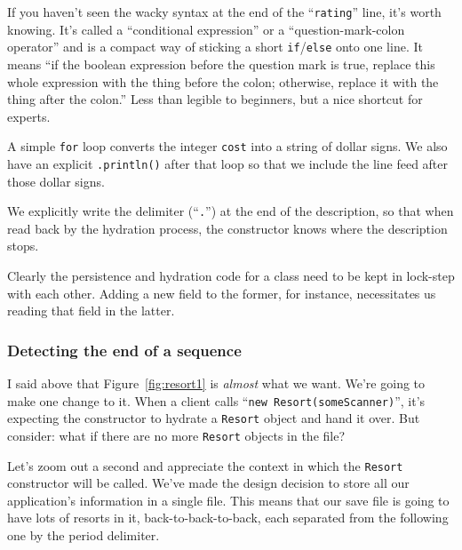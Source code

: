 \begin{compactitem}

\item If you haven't seen the wacky syntax at the end of the
``\texttt{rating}'' line, it's worth knowing. It's called a ``conditional
expression'' or a ``question-mark-colon operator'' and is a compact way of
sticking a short \texttt{if}/\texttt{else} onto one line. It means ``if the
boolean expression before the question mark is true, replace this whole
expression with the thing before the colon; otherwise, replace it with the
thing after the colon.'' Less than legible to beginners, but a nice shortcut
for experts.

\item A simple \texttt{for} loop converts the integer \texttt{cost} into a
string of dollar signs. We also have an explicit \texttt{.println()} after
that loop so that we include the line feed after those dollar signs.

\item We explicitly write the delimiter (``\texttt{.}'') at the end of the
description, so that when read back by the hydration process, the constructor
knows where the description stops.

\end{compactitem}

Clearly the persistence and hydration code for a class need to be kept in
lock-step with each other. Adding a new field to the former, for instance,
necessitates us reading that field in the latter.

\subsubsection{Detecting the end of a sequence}

I said above that Figure~\ref{fig:resort1} is \textit{almost} what we want.
We're going to make one change to it. When a client calls ``\texttt{new
Resort(someScanner)}'', it's expecting the constructor to hydrate a
\texttt{Resort} object and hand it over. But consider: what if there are no
more \texttt{Resort} objects in the file?

Let's zoom out a second and appreciate the context in which the
\texttt{Resort} constructor will be called. We've made the design decision to
store all our application's information in a single file. This means that our
save file is going to have lots of resorts in it, back-to-back-to-back, each
separated from the following one by the period delimiter.

